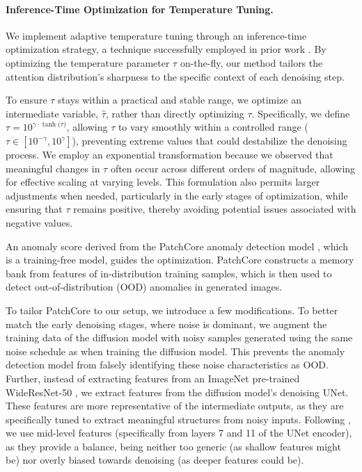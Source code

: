 \vspace{-10pt}
\paragraph{Inference-Time Optimization for Temperature Tuning.}
We implement adaptive temperature tuning through an inference-time optimization strategy, a technique successfully employed in prior work \citep{poole2022dreamfusion, burgert2022peekaboo, burgert2024diffusion, lin2023magic3d}.
By optimizing the temperature parameter $\tau$ on-the-fly, our method tailors the attention distribution's sharpness to the specific context of each denoising step.

To ensure $\tau$ stays within a practical and stable range, we optimize an intermediate variable, $\hat{\tau}$, rather than directly optimizing $\tau$. 
Specifically, we define $\tau = 10^{\gamma \cdot \tanh{(\hat{\tau}})}$, allowing $\tau$ to vary smoothly within a controlled range (\ie $\tau \in [10^{-\gamma}, 10^{\gamma}]$), preventing extreme values that could destabilize the denoising process. 
We employ an exponential transformation because we observed that meaningful changes in $\tau$ often occur across different orders of magnitude, allowing for effective scaling at varying levels. 
This formulation also permits larger adjustments when needed, particularly in the early stages of optimization, while ensuring that $\tau$ remains positive, thereby avoiding potential issues associated with negative values.

An anomaly score derived from the PatchCore anomaly detection model \citep{roth2022patchcore}, which is a training-free model,  guides the optimization.
PatchCore constructs a memory bank from features of in-distribution training samples, which is then used to detect out-of-distribution (OOD) anomalies in generated images. 

To tailor PatchCore to our setup, we introduce a few modifications. 
To better match the early denoising stages, where noise is dominant, we augment the training data of the diffusion model with noisy samples generated using the same noise schedule as when training the diffusion model. 
This prevents the anomaly detection model from falsely identifying these noise characteristics as OOD. 
Further, instead of extracting features from an ImageNet pre-trained WideResNet-50 \citep{zagoruyko2016wide}, we extract features from the diffusion model's denoising UNet. 
These features are more representative of the intermediate outputs, as they are specifically tuned to extract meaningful structures from noisy inputs.
Following \citet{roth2022patchcore}, we use mid-level features (specifically from layers 7 and 11 of the UNet encoder), as they provide a balance, being neither too generic (as shallow features might be) nor overly biased towards denoising (as deeper features could be). 

